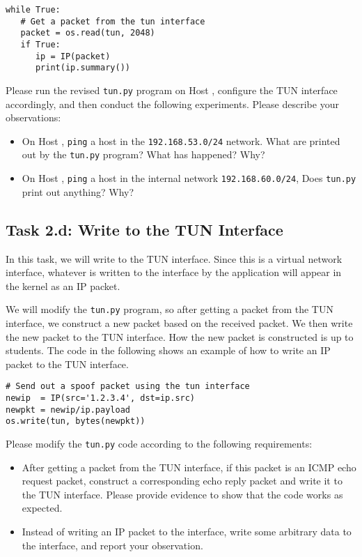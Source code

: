 \begin{lstlisting}
while True:
   # Get a packet from the tun interface
   packet = os.read(tun, 2048)
   if True:
      ip = IP(packet)
      print(ip.summary())
\end{lstlisting}


Please run the revised \texttt{tun.py} program on Host \hostu, configure the 
TUN interface accordingly, and then 
conduct the following experiments. Please 
describe your observations: 


\begin{itemize}
\item On Host \hostu, \texttt{ping} a host in the \texttt{192.168.53.0/24} network. 
What are printed out by the \texttt{tun.py} program? What has happened? Why?   

\item On Host \hostu,  \texttt{ping} a host in the internal network \texttt{192.168.60.0/24}, 
Does \texttt{tun.py} print out anything? Why?   
\end{itemize}
 



\subsection{Task 2.d: Write to the TUN Interface} 


In this task, we will write to the TUN interface. Since this is a virtual network 
interface, whatever is written to the interface by the application will
appear in the kernel as an IP packet.


We will modify the \texttt{tun.py} program, so after getting a packet from the TUN interface, 
we construct a new packet based 
on the received packet. We then write the new packet to the TUN interface.
How the new packet is constructed is up to students. The code in the following
shows an example of how to write an IP packet to the TUN interface. 


\begin{lstlisting}
# Send out a spoof packet using the tun interface
newip  = IP(src='1.2.3.4', dst=ip.src)
newpkt = newip/ip.payload
os.write(tun, bytes(newpkt))
\end{lstlisting}

Please modify the \texttt{tun.py} code according to the following requirements:

\begin{itemize}
\item After getting a packet from the TUN interface, if this packet
is an ICMP echo request packet, construct a corresponding 
echo reply packet and write it to the TUN interface. Please provide
evidence to show that the code works as expected. 

\item Instead of writing an IP packet to the interface, write some arbitrary data to the 
interface, and report your observation. 
\end{itemize}
 




